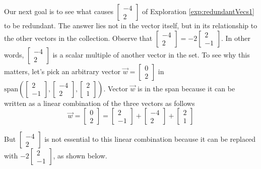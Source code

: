 \documentclass{ximera}
\begin{document}
Our next goal is to see what causes $\begin{bmatrix}-4\\2\end{bmatrix}$ of Exploration \ref{exp:redundantVecs1} to be redundant.  The answer lies not in the vector itself, but in its relationship to the other vectors in the collection. Observe that $\begin{bmatrix}-4\\2\end{bmatrix}=-2\begin{bmatrix}2\\-1\end{bmatrix}$.  In other words, $\begin{bmatrix}-4\\2\end{bmatrix}$ is a scalar multiple of another vector in the set.  To see why this matters, let's pick an arbitrary vector $\vec{w}=\begin{bmatrix}0\\2\end{bmatrix}$ in $\mbox{span}\left(\begin{bmatrix}2\\-1\end{bmatrix}, \begin{bmatrix}-4\\2\end{bmatrix}, \begin{bmatrix}2\\1\end{bmatrix}\right)$.  Vector $\vec{w}$ is in the span because it can be written as a linear combination of the three vectors as follows
$$\vec{w}=\begin{bmatrix}0\\2\end{bmatrix}=\begin{bmatrix}2\\-1\end{bmatrix}+ \begin{bmatrix}-4\\2\end{bmatrix}+ \begin{bmatrix}2\\1\end{bmatrix}$$

But $\begin{bmatrix}-4\\2\end{bmatrix}$ is not essential to this linear combination because it can be replaced with $-2\begin{bmatrix}2\\-1\end{bmatrix}$, as shown below.
\end{document}
